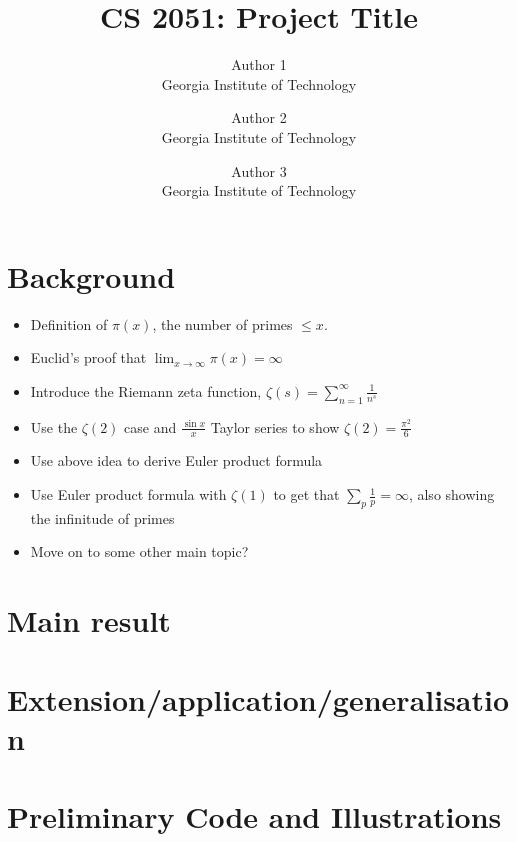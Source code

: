 \documentclass{article}
\title{CS 2051: Project Title}
\author{Author 1 \\ Georgia Institute of Technology
\and Author 2 \\ Georgia Institute of Technology
\and Author 3 \\ Georgia Institute of Technology}
\date{}
\begin{document}
\maketitle

\section{Background}
\begin{itemize}
  \item Definition of $\pi(x)$, the number of primes $\le x$.
  \item Euclid's proof that $\lim_{x \to \infty}\pi(x) = \infty$
  \item Introduce the Riemann zeta function, $\zeta(s) = \sum_{n = 1}^{\infty}\frac{1}{n^s}$
  \item Use the $\zeta(2)$ case and $\frac{\sin{x}}{x}$ Taylor series to show $\zeta(2) = \frac{\pi^2}{6}$
  \item Use above idea to derive Euler product formula
  \item Use Euler product formula with $\zeta(1)$ to get that $\sum_{p}\frac{1}{p} = \infty$, also showing the infinitude of primes
  \item Move on to some other main topic?
\end{itemize}


\section{Main result}


\section{Extension/application/generalisation}


\section{Preliminary Code and Illustrations}
\end{document}
